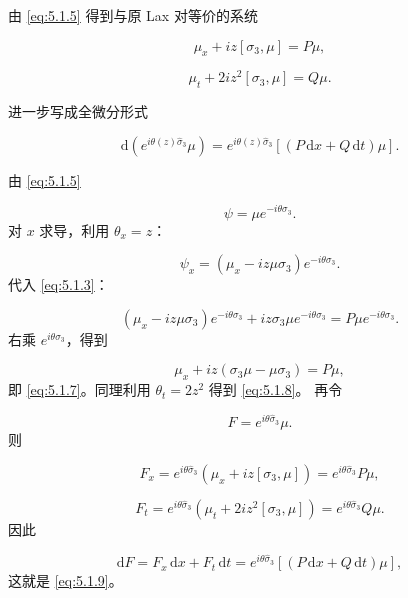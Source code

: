 \documentclass[
    lang=cn,
    scheme=chinese,
    mode=simple,
    device=normal,
    color=blue,
    math=cm,
    thmcnt=section,
    12pt,
    nowatermark
]{elegantbook}
\begin{document}
由 \eqref{eq:5.1.5} 得到与原 Lax 对等价的系统

\begin{equation}
    \mu_x+iz[\sigma_3,\mu]=P\mu,
    \tag{5.1.7}
    \label{eq:5.1.7}
\end{equation}

\begin{equation}
    \mu_t+2iz^2[\sigma_3,\mu]=Q\mu.
    \tag{5.1.8}
    \label{eq:5.1.8}
\end{equation}

进一步写成全微分形式

\begin{equation}
    \mathrm d\!\left(e^{i\theta(z)\widehat{\sigma}_3}\mu\right)
    =
    e^{i\theta(z)\widehat{\sigma}_3}
    \left[(P\,\mathrm dx+Q\,\mathrm dt)\mu\right].
    \tag{5.1.9}
    \label{eq:5.1.9}
\end{equation}

\begin{callout}
    由 \eqref{eq:5.1.5}

    \[
        \psi=\mu e^{-i\theta\sigma_3}.
    \]
    对 $x$ 求导，利用 $\theta_x=z$：

    \[
        \psi_x
        =
        \left(
        \mu_x-iz\mu\sigma_3
        \right)e^{-i\theta\sigma_3}.
    \]
    代入 \eqref{eq:5.1.3}：

    \[
        \left(
        \mu_x-iz\mu\sigma_3
        \right)e^{-i\theta\sigma_3}
        +
        iz\sigma_3\mu e^{-i\theta\sigma_3}
        =
        P\mu e^{-i\theta\sigma_3}.
    \]
    右乘 $e^{i\theta\sigma_3}$，得到

    \[
        \mu_x+iz(\sigma_3\mu-\mu\sigma_3)=P\mu,
    \]
    即 \eqref{eq:5.1.7}。同理利用 $\theta_t=2z^2$ 得到 \eqref{eq:5.1.8}。
    再令

    \[
        F=e^{i\theta\widehat{\sigma}_3}\mu.
    \]
    则

    \[
        F_x
        =
        e^{i\theta\widehat{\sigma}_3}
        \left(
        \mu_x+iz[\sigma_3,\mu]
        \right)
        =
        e^{i\theta\widehat{\sigma}_3}P\mu,
    \]

    \[
        F_t
        =
        e^{i\theta\widehat{\sigma}_3}
        \left(
        \mu_t+2iz^2[\sigma_3,\mu]
        \right)
        =
        e^{i\theta\widehat{\sigma}_3}Q\mu.
    \]
    因此

    \[
        \mathrm dF
        =
        F_x\,\mathrm dx+F_t\,\mathrm dt
        =
        e^{i\theta\widehat{\sigma}_3}
        \left[(P\,\mathrm dx+Q\,\mathrm dt)\mu\right],
    \]
    这就是 \eqref{eq:5.1.9}。
\end{callout}
\end{document}
